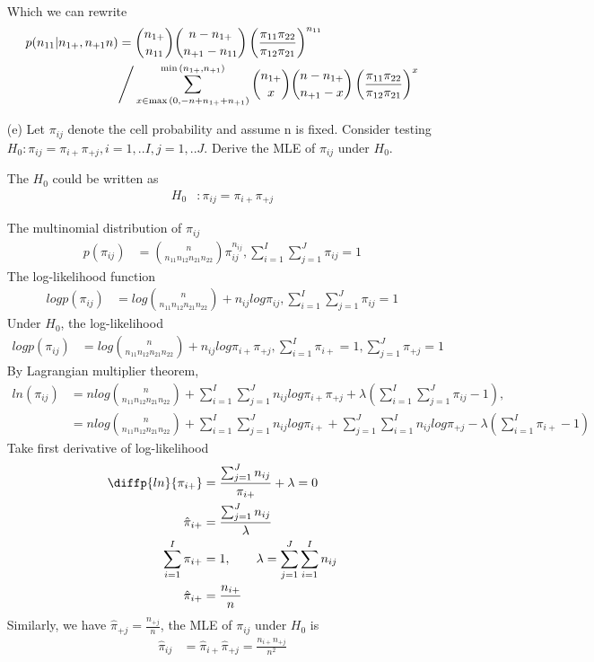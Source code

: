 \documentclass[11pt]{article} %
\begin{document}
\begin{itemize}
\begin{align*}
\end{align*}	
Which we can rewrite 
\begin{align*}
	p(n_{11}|n_{1+}, n_{+1} n) &= {n_{1+} \choose n_{11}} {n - n_{1+} \choose n_{+1}-n_{11}} \left( \frac{\pi_{11} \pi_{22}}{\pi_{12} \pi_{21}} \right)^{n_{11}}\\
	& \Bigg{/}  \sum_{x \in \max{(0, -n + n_{1+} + n_{+1})}}^{\min{(n_{1+}, n_{+1})}} {n_{1+} \choose x} {n - n_{1+} \choose n_{+1}-x} \left( \frac{\pi_{11} \pi_{22}}{\pi_{12} \pi_{21}}\right) ^x
\end{align*}

\item[(e)] Let $\pi_{ij}$ denote the cell probability and assume n is fixed. Consider testing $H_0: \pi_{ij} = \pi_{i+} \pi_{+j}, i=1,..I, j=1,..J$. Derive the MLE of $\pi_{ij}$ under $H_0$.

The $H_0$ could be written as 
\begin{align*}
	H_0 &: \pi_{ij} = \pi_{i+} \pi_{+j}
\end{align*}

The multinomial distribution of $\pi_{ij}$
\begin{align*}
	p(\pi_{ij}) &= {n \choose n_{11} n_{12} n_{21} n_{22}} \pi_{ij}^{n_{ij}} , \sum_{i=1}^I \sum_{j=1}^J \pi_{ij} = 1
\end{align*}
The log-likelihood function
\begin{align*}
	log p(\pi_{ij}) &= log {n \choose n_{11} n_{12} n_{21} n_{22}} +  n_{ij} log \pi_{ij} , \sum_{i=1}^I \sum_{j=1}^J \pi_{ij} = 1
\end{align*}
Under $H_0$, the log-likelihood
\begin{align*}
	log p(\pi_{ij}) &= log {n \choose n_{11} n_{12} n_{21} n_{22}} +  n_{ij} log \pi_{i+} \pi_{+j} , \sum_{i=1}^I \pi_{i+} = 1, \sum_{j=1}^J \pi_{+j} = 1 
\end{align*}
By Lagrangian multiplier theorem,
\begin{align*}
	ln(\pi_{ij}) &=n log {n \choose n_{11} n_{12} n_{21} n_{22}} +\sum_{i=1}^I \sum_{j=1}^J n_{ij} log \pi_{i+} \pi_{+j} + \lambda ( \sum_{i=1}^I \sum_{j=1}^J \pi_{ij} - 1),\\
	&= n log {n \choose n_{11} n_{12} n_{21} n_{22}} +\sum_{i=1}^I \sum_{j=1}^J n_{ij} log \pi_{i+} + \sum_{j=1}^J \sum_{i=1}^I n_{ij} log \pi_{+j} - \lambda ( \sum_{i=1}^I \pi_{i+} - 1)
\end{align*}
Take first derivative of log-likelihood
\begin{align*}
	\diffp{ln}{{\pi_{i+}}} &= \frac{\sum_{j=1}^J n_{ij}}{\pi_{i+}} + \lambda = 0 \\
	\hat{\pi}_{i+} &= \frac{\sum_{j=1}^J n_{ij}}{\lambda}\\
	\sum_{i=1}^I \pi_{i+} &= 1, \qquad \lambda = \sum_{j=1}^J \sum_{i=1}^I n_{ij}\\
	\hat{\pi}_{i+} &= \frac{n_{i+}}{n}
\end{align*}
Similarly, we have $\hat{\pi}_{+j} = \frac{n_{+j}}{n}$, the MLE of $\pi_{ij}$ under $H_0$ is 
\begin{align*}
	\hat{\pi}_{ij} &= \hat{\pi}_{i+} \hat{\pi}_{+j} = \frac{n_{i+} n_{+j}}{n^2}
\end{align*}


\end{itemize}
\end{document}
